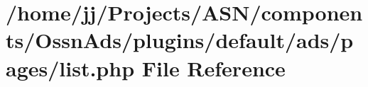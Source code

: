 \hypertarget{components_2_ossn_ads_2plugins_2default_2ads_2pages_2list_8php}{}\section{/home/jj/\+Projects/\+A\+S\+N/components/\+Ossn\+Ads/plugins/default/ads/pages/list.php File Reference}
\label{components_2_ossn_ads_2plugins_2default_2ads_2pages_2list_8php}
